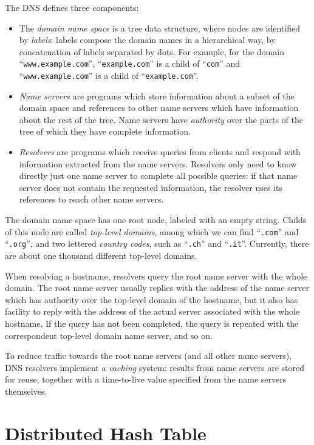 \documentclass[mscthesis]{usiinfthesis}
\begin{document}
The DNS defines three components:
\begin{itemize}
	\item The \emph{domain name space} is a tree data structure, where nodes are identified by \emph{labels}: labels compose the domain names in a hierarchical way, by concatenation of labels separated by dots. For example, for the domain ``\texttt{www.example.com}'', ``\texttt{example.com}'' is a child of ``\texttt{com}'' and ``\texttt{www.example.com}'' is a child of ``\texttt{example.com}''.
	\item \emph{Name servers} are programs which store information about a subset of the domain space and references to other name servers which have information about the rest of the tree. Name servers have \emph{authority} over the parts of the tree of which they have complete information.
	\item \emph{Resolvers} are programs which receive queries from clients and respond with information extracted from the name servers. Resolvers only need to know directly just one name server to complete all possible queries: if that name server does not contain the requested information, the resolver uses its references to reach other name servers.
\end{itemize}
The domain name space has one root node, labeled with an empty string. Childs of this node are called \emph{top-level domains}, among which we can find ``\texttt{.com}'' and ``\texttt{.org}'', and two lettered \emph{country codes}, such as ``\texttt{.ch}'' and ``\texttt{.it}''. Currently, there are about one thousand different top-level domains\cite{website:tldlist}.

When resolving a hostname, resolvers query the root name server with the whole domain. The root name server usually replies with the address of the name server which has authority over the top-level domain of the hostname, but it also has facility to reply with the address of the actual server associated with the whole hostname. If the query has not been completed, the query is repeated with the correspondent top-level domain name server, and so on.

To reduce traffic towards the root name servers (and all other name servers), DNS resolvers implement a \emph{caching} system: results from name servers are stored for reuse, together with a time-to-live value specified from the name servers themselves. 

\chapter{Distributed Hash Table}\label{appx:dht}
\end{document}
